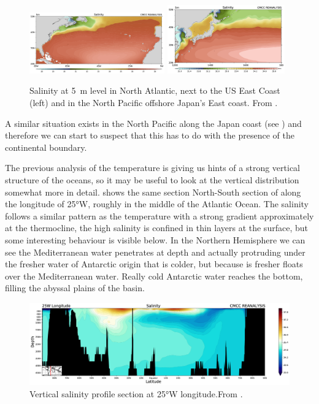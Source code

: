 \begin{figure}
	\centering
	\includegraphics[width=0.52\textwidth]{figs/salinity-us-east-coast-5m}
	\hfill
	\includegraphics[width=0.45\textwidth]{figs/salinity-japan-5m}
	\caption{Salinity at \qty{5}{\meter} level in North Atlantic, next to the US East Coast (left) and in the North Pacific offshore Japan's East coast. From \CMCCreanalysis.}
	\label{fig:salinity-us-east-coast-japan}
\end{figure}
A similar situation exists in the North Pacific along the Japan coast (see \fig{\ref{fig:salinity-us-east-coast-japan}})
and therefore we can start to suspect that this has to do with the presence of the continental boundary.

The previous analysis of the temperature is giving us hints of a strong
vertical structure of the oceans, so it may be useful to look at the
vertical distribution somewhat more in detail. \fig{\ref{fig:salinity-vertical-25W}} shows the same section North-South section of along the longitude of \ang{25}W, roughly in the middle of the Atlantic Ocean.
The salinity follows a similar pattern as the temperature with a
strong gradient approximately at the thermocline, the high salinity is
confined in thin layers at the surface, but some interesting behaviour
is visible below. In the Northern Hemisphere we can see the
Mediterranean water penetrates at depth and actually protruding under the fresher water of Antarctic origin that is colder, but because is
fresher floats over the Mediterranean water. Really cold Antarctic water reaches the bottom, filling the abyssal plains of the basin.

\begin{figure}
	\centering
	\includegraphics[width = 0.7 \textwidth]{figs/salinity-vertical-25W}
	\caption{Vertical salinity profile section at \ang{25}W longitude.From \CMCCreanalysis.}
	\label{fig:salinity-vertical-25W}
\end{figure}

